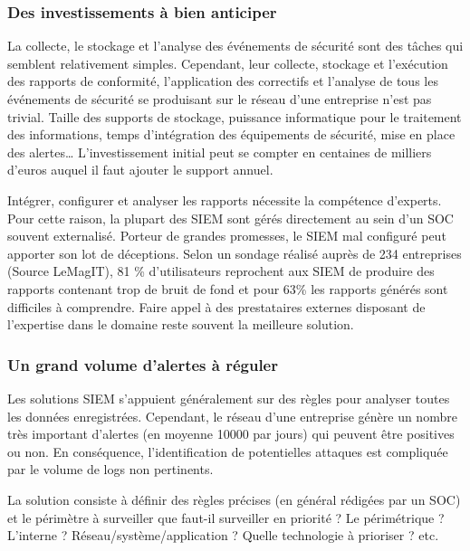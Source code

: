 \subsubsection{Des investissements à bien anticiper }

La collecte, le stockage et l’analyse des événements de sécurité sont des tâches qui semblent relativement simples. Cependant, leur collecte, stockage et l’exécution des rapports de conformité, l’application des correctifs et l’analyse de tous les événements de sécurité se produisant sur le réseau d’une entreprise n’est pas trivial. Taille des supports de stockage, puissance informatique pour le traitement des informations, temps d’intégration des équipements de sécurité, mise en place des alertes… L’investissement initial peut se compter en centaines de milliers d’euros auquel il faut ajouter le support annuel. 

Intégrer, configurer et analyser les rapports nécessite la compétence d’experts. Pour cette raison, la plupart des SIEM sont gérés directement au sein d’un SOC souvent externalisé. Porteur de grandes promesses, le SIEM mal configuré peut apporter son lot de déceptions. Selon un sondage réalisé auprès de 234 entreprises (Source LeMagIT), 81 \% d’utilisateurs reprochent aux SIEM de produire des rapports contenant trop de bruit de fond et pour 63\% les rapports générés sont difficiles à comprendre. Faire appel à des prestataires externes disposant de l’expertise dans le domaine reste souvent la meilleure solution.  


\subsubsection{Un grand volume d’alertes à réguler }

Les solutions SIEM s’appuient généralement sur des règles pour analyser toutes les données enregistrées. Cependant, le réseau d’une entreprise génère un nombre très important d'alertes (en moyenne 10000 par jours) qui peuvent être positives ou non. En conséquence, l’identification de potentielles attaques est compliquée par le volume de logs non pertinents. 

La solution consiste à définir des règles précises (en général rédigées par un SOC) et le périmètre à surveiller que faut-il surveiller en priorité ? Le périmétrique ? L’interne ? Réseau/système/application ? Quelle technologie à prioriser ? etc. 

